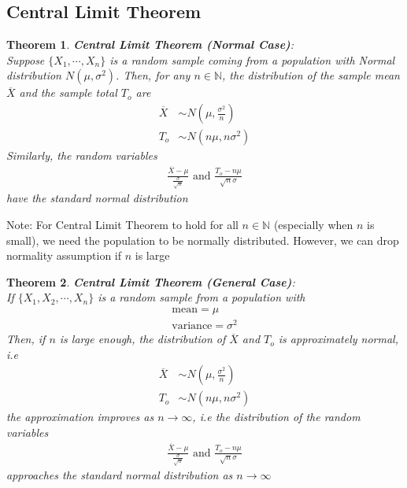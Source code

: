 \documentclass[11pt,oneside]{book}
\theoremstyle{newStyle}
\newtheorem{thm}{Theorem}[chapter]
\newcommand{\N}{\mathbb{N}}
\newcommand{\note}{\color{red}Note: \color{black}}
\begin{document}
 \subsection[Central Limit Theorem]{Central Limit Theorem}
 \begin{thm}
 \textbf{Central Limit Theorem (Normal Case)}:\\
 Suppose $\{X_1,\cdots,X_n\}$ is a random sample coming from a population with Normal distribution $N(\mu,\sigma^2)$. Then, for any $n\in \N$, the distribution of the sample mean $\overline{X}$ and the sample total $T_o$ are \begin{align*}
 \overline{X}&\sim N\left(\mu,\frac{\sigma^2}{n}\right)\\
 T_o&\sim N\left(n\mu,n\sigma^2\right)
 \end{align*}
 Similarly, the random variables \begin{align*}
 \frac{\overline{X}-\mu}{\frac{\sigma}{\sqrt{n}}}\text{ and } \frac{T_o-n\mu}{\sqrt{n}\sigma}
 \end{align*}
 have the standard normal distribution
 \end{thm}
 \note For Central Limit Theorem to hold for all $n\in \N$ (especially when $n$ is small), we need the population to be normally distributed. However, we can drop normality assumption if $n$ is large \\
 \begin{thm}
  \textbf{Central Limit Theorem (General Case)}:\\
  If $\{X_1,X_2,\cdots,X_n\}$ is a random sample from a population with \begin{align*}
  \text{mean}=\mu\\
  \text{variance}=\sigma^2
  \end{align*}
  Then, if $n$ is large enough, the distribution of $\overline{X}$ and $T_o$ is approximately normal, i.e \begin{align*}
 \overline{X}&\sim N\left(\mu,\frac{\sigma^2}{n}\right)\\
 T_o&\sim N\left(n\mu,n\sigma^2\right)
 \end{align*}
 the approximation improves as $n\to \infty$, i.e the distribution of the random variables \begin{align*}
 \frac{\overline{X}-\mu}{\frac{\sigma}{\sqrt{n}}}\text{ and } \frac{T_o-n\mu}{\sqrt{n}\sigma}
 \end{align*}
 approaches the standard normal distribution as $n\to \infty$
 \end{thm}
\end{document}

